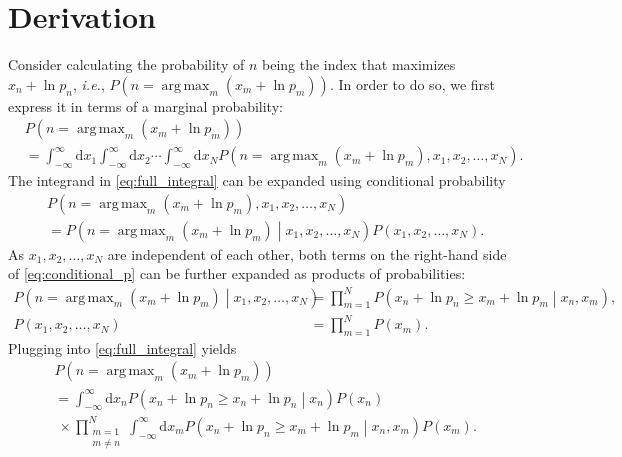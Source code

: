 \documentclass{book}[12pt]
\DeclareMathOperator*{\argmax}{arg\,max}
\begin{document}
\section*{Derivation}
Consider calculating the probability of $n$ being the index that maximizes $x_n+\ln p_n$, {\it i.e.}, $P\left(n=\argmax_m\left(x_m+\ln p_m\right)\right)$. In order to do so, we first express it in terms of a marginal probability:
\begin{align}
     & P\left(n=\argmax_m\left(x_m+\ln p_m\right)\right)\nonumber                                                                                                                                                   \\
     & =\int_{-\infty}^\infty\mathrm{d}x_1 \int_{-\infty}^\infty\mathrm{d}x_2\cdots \int_{-\infty}^\infty\mathrm{d}x_N P\left(n=\argmax_m\left(x_m+\ln p_m\right),x_1,x_2,\dots,x_N\right).\label{eq:full_integral}
\end{align}
The integrand in \cref{eq:full_integral} can be expanded using conditional probability
\begin{align}
     & P\left(n=\argmax_m\left(x_m+\ln p_m\right),x_1,x_2,\dots,x_N\right)\nonumber                                                        \\
     & =P\left(n=\argmax_m\left(x_m+\ln p_m\right)\middle|x_1,x_2,\dots,x_N\right)P\left(x_1,x_2,\dots,x_N\right)\label{eq:conditional_p}.
\end{align}
As $x_1,x_2,\dots,x_N$ are independent of each other, both terms on the right-hand side of \cref{eq:conditional_p} can be further expanded as products of probabilities:
\begin{align}
    P\left(n=\argmax_m\left(x_m+\ln p_m\right)\middle|x_1,x_2,\dots,x_N\right) & =\prod_{m=1}^N P\left(x_n+\ln p_n\geq x_m+\ln p_m\middle|x_n,x_m\right),\label{eq:expansion1} \\
    P\left(x_1,x_2,\dots,x_N\right)                                            & =\prod_{m=1}^N P\left(x_m\right).\label{eq:expansion2}
\end{align}
Plugging  into \cref{eq:full_integral} yields
\begin{align}
     & P\left(n=\argmax_m\left(x_m+\ln p_m\right)\right)\nonumber                                                           \\
     & =\int_{-\infty}^\infty\mathrm{d}x_n P\left(x_n+\ln p_n\geq x_n+\ln p_n\middle|x_n\right) P\left(x_n\right) \nonumber \\
     & ~\times\prod_{\substack{m=1\\m\neq n}}^N \int_{-\infty}^\infty\mathrm{d}x_m P\left(x_n+\ln p_n\geq x_m+\ln p_m\middle|x_n,x_m\right) P\left(x_m\right).\label{eq:expanded_integral}
\end{align}
\end{document}
